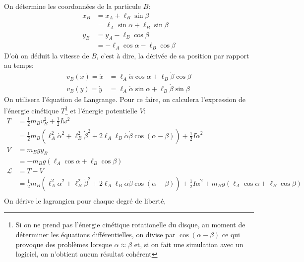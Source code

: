 \documentclass[10pt]{article}
\begin{document}
On détermine les coordonnées de la particule $B$:
\begin{align*}
x_B &= x_A + \ell_B\sin{\beta} \\
	&= \ell_A\sin{\alpha} + \ell_B\sin{\beta} \\
y_B &= y_A - \ell_B\cos{\beta} \\
	&= -\ell_A\cos{\alpha} - \ell_B\cos{\beta}
\end{align*}
D'où on déduit la vitesse de $B$, c'est à dire, la dérivée de sa position par rapport au temps:
\begin{align}
v_B(x) = \dot{x} &= \ell_A\dot{\alpha}\cos{\alpha} + \ell_B\dot{\beta}\cos{\beta} \\
v_B(y) = \dot{y} &= \ell_A\dot{\alpha}\sin{\alpha} + \ell_B\dot{\beta}\sin{\beta}
\end{align}
On utilisera l'équation de Langrange. Pour ce faire, on calculera l'expression de l'énergie cinétique $T$\footnote{Si on ne prend pas l'énergie cinétique rotationelle du disque, au moment de déterminer les équations différentielles, on divise par $\cos{(\alpha-\beta)}$ ce qui provoque des problèmes lorsque $\alpha \approx \beta$ et, si on fait une simulation avec un logiciel, on n'obtient aucun résultat cohérent} et l'énergie potentielle $V$:
\begin{align*}
T &= \frac12m_Bv_B^2 + \frac12I\omega^2 \\
	&= \frac12m_B\left(\ell_A^2\dot{\alpha}^2+\ell_B^2\dot{\beta}^2+ 2\ell_A\ell_B\dot{\alpha}\dot{\beta}\cos{(\alpha-\beta)}\right) + \frac12I\dot{\alpha}^2 \\
V &= m_Bgy_B \\
	&= -m_Bg\left(\ell_A\cos{\alpha} + \ell_B\cos{\beta}\right) \\
\mathcal{L} &= T-V \\
 &= \frac12m_B\left(\ell_A^2\dot{\alpha}^2+\ell_B^2\dot{\beta}^2+ 2\ell_A\ell_B\dot{\alpha}\dot{\beta}\cos{(\alpha-\beta)}\right) + \frac12I\dot{\alpha}^2 + m_Bg\left(\ell_A\cos{\alpha} + \ell_B\cos{\beta}\right) \\
\end{align*}
On dérive le lagrangien pour chaque degré de liberté,
\end{document}

